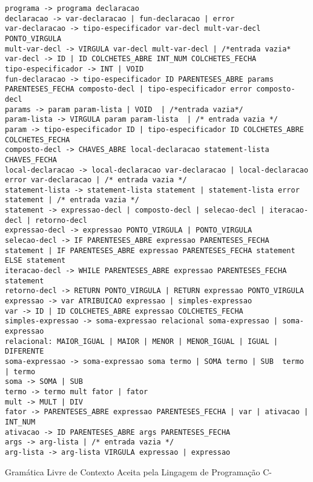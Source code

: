 \begin{algorithm}


\begin{lstlisting}
programa -> programa declaracao
declaracao -> var-declaracao | fun-declaracao | error
var-declaracao -> tipo-especificador var-decl mult-var-decl PONTO_VIRGULA
mult-var-decl -> VIRGULA var-decl mult-var-decl | /*entrada vazia*
var-decl -> ID | ID COLCHETES_ABRE INT_NUM COLCHETES_FECHA
tipo-especificador -> INT | VOID
fun-declaracao -> tipo-especificador ID PARENTESES_ABRE params PARENTESES_FECHA composto-decl | tipo-especificador error composto-decl
params -> param param-lista | VOID  | /*entrada vazia*/
param-lista -> VIRGULA param param-lista  | /* entrada vazia */
param -> tipo-especificador ID | tipo-especificador ID COLCHETES_ABRE COLCHETES_FECHA
composto-decl -> CHAVES_ABRE local-declaracao statement-lista CHAVES_FECHA
local-declaracao -> local-declaracao var-declaracao | local-declaracao error var-declaracao | /* entrada vazia */
statement-lista -> statement-lista statement | statement-lista error statement | /* entrada vazia */ 
statement -> expressao-decl | composto-decl | selecao-decl | iteracao-decl | retorno-decl 
expressao-decl -> expressao PONTO_VIRGULA | PONTO_VIRGULA
selecao-decl -> IF PARENTESES_ABRE expressao PARENTESES_FECHA statement | IF PARENTESES_ABRE expressao PARENTESES_FECHA statement ELSE statement
iteracao-decl -> WHILE PARENTESES_ABRE expressao PARENTESES_FECHA statement
retorno-decl -> RETURN PONTO_VIRGULA | RETURN expressao PONTO_VIRGULA
expressao -> var ATRIBUICAO expressao | simples-expressao
var -> ID | ID COLCHETES_ABRE expressao COLCHETES_FECHA
simples-expressao -> soma-expressao relacional soma-expressao | soma-expressao
relacional: MAIOR_IGUAL | MAIOR | MENOR | MENOR_IGUAL | IGUAL | DIFERENTE
soma-expressao -> soma-expressao soma termo | SOMA termo | SUB  termo | termo
soma -> SOMA | SUB
termo -> termo mult fator | fator
mult -> MULT | DIV
fator -> PARENTESES_ABRE expressao PARENTESES_FECHA | var | ativacao | INT_NUM
ativacao -> ID PARENTESES_ABRE args PARENTESES_FECHA
args -> arg-lista | /* entrada vazia */ 
arg-lista -> arg-lista VIRGULA expressao | expressao
\end{lstlisting}  

\caption{Gramática Livre de Contexto Aceita pela Lingagem de Programação C-}       
\label{al:sintaxec-}

\end{algorithm} 
\clearpage

